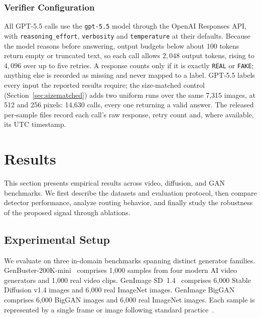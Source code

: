\documentclass{ieeeaccess}
\begin{document}
\subsubsection{Verifier Configuration}
\label{sec:gpt55_audit}

All GPT-5.5 calls use the \texttt{gpt-5.5} model through the OpenAI Responses API, with
\texttt{reasoning\_effort}, \texttt{verbosity} and \texttt{temperature} at their defaults.
Because the model reasons before answering, output budgets below about 100 tokens return
empty or truncated text, so each call allows $2{,}048$ output tokens, rising to $4{,}096$
over up to five retries. A response counts only if it is exactly \texttt{REAL} or
\texttt{FAKE}; anything else is recorded as missing and never mapped to a label. GPT-5.5
labels every input the reported results require; the size-matched control
(Section~\ref{sec:sizematched}) adds two uniform runs over the same 7{,}315 images, at 512
and 256 pixels: 14{,}630 calls, every one returning a valid answer. The released per-sample files record
each call's raw response, retry count and, where available, its UTC timestamp.

\section{Results}
\label{sec:results}

This section presents empirical results across video, diffusion, and GAN benchmarks. We first describe the datasets and evaluation protocol, then compare detector performance, analyze routing behavior, and finally study the robustness of the proposed signal through ablations.

\subsection{Experimental Setup}
\label{sec:exp_setup}

We evaluate on three in-domain benchmarks spanning distinct generator families.
GenBuster-200K-mini~\cite{wen2025busterxmllmpoweredaigeneratedvideo} comprises 1{,}000
samples from four modern AI video generators and 1{,}000 real video clips.
GenImage SD~1.4~\cite{NEURIPS2023_f4d4a021} comprises 6{,}000 Stable Diffusion v1.4
images and 6{,}000 real ImageNet images. GenImage
BigGAN~\cite{NEURIPS2023_f4d4a021} comprises 6{,}000 BigGAN images and 6{,}000 real
ImageNet images. Each sample is represented by a single frame or image following standard
practice~\cite{wen2025busterxmllmpoweredaigeneratedvideo}.
\end{document}
